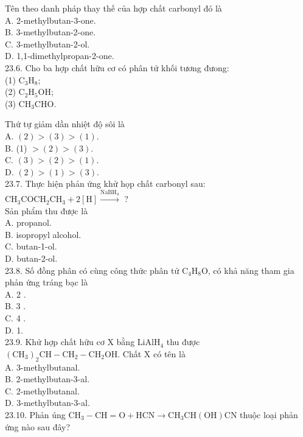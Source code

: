 \documentclass[10pt]{article}
\begin{document}
Tên theo danh pháp thay thế của hợp chất carbonyl đó là\\
A. 2-methylbutan-3-one.\\
B. 3-methylbutan-2-one.\\
C. 3-methylbutan-2-ol.\\
D. 1,1-dimethylpropan-2-one.\\
23.6. Cho ba hợp chất hữu cơ có phân tử khối tương đưong:\\
(1) $\mathrm{C}_{3} \mathrm{H}_{8}$;\\
(2) $\mathrm{C}_{2} \mathrm{H}_{5} \mathrm{OH}$;\\
(3) $\mathrm{CH}_{3} \mathrm{CHO}$.

Thứ tự giảm dần nhiệt độ sôi là\\
A. $(2)>(3)>(1)$.\\
B. (1) $>(2)>(3)$.\\
C. $(3)>(2)>(1)$.\\
D. $(2)>(1)>(3)$.\\
23.7. Thực hiện phản ứng khử họp chất carbonyl sau:\\
$\mathrm{CH}_{3} \mathrm{COCH}_{2} \mathrm{CH}_{3}+2[\mathrm{H}] \xrightarrow{\mathrm{NaBH}_{4}}$ ?\\
Sản phẩm thu được là\\
A. propanol.\\
B. isopropyl alcohol.\\
C. butan-1-ol.\\
D. butan-2-ol.\\
23.8. Số đồng phân có cùng công thức phân tử $\mathrm{C}_{4} \mathrm{H}_{8} \mathrm{O}$, có khả năng tham gia phản ứng tráng bạc là\\
A. 2 .\\
B. 3 .\\
C. 4 .\\
D. 1.\\
23.9. Khử hợp chất hữu cơ X bằng $\mathrm{LiAlH}_{4}$ thu được $\left(\mathrm{CH}_{3}\right)_{2} \mathrm{CH}-\mathrm{CH}_{2}-\mathrm{CH}_{2} \mathrm{OH}$. Chất X có tên là\\
A. 3-methylbutanal.\\
B. 2-methylbutan-3-al.\\
C. 2-methylbutanal.\\
D. 3-methylbutan-3-al.\\
23.10. Phản úng $\mathrm{CH}_{3}-\mathrm{CH}=\mathrm{O}+\mathrm{HCN} \rightarrow \mathrm{CH}_{3} \mathrm{CH}(\mathrm{OH}) \mathrm{CN}$ thuộc loại phản ứng nào sau đây?\\
\end{document}
